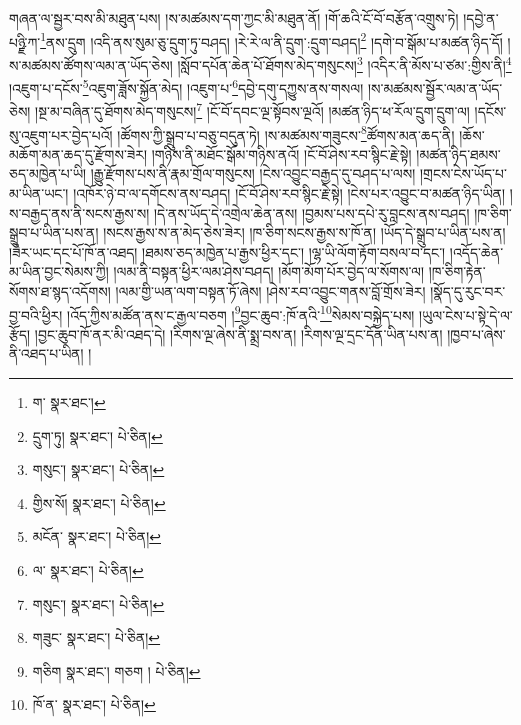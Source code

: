 གཞན་ལ་སྦྱར་བས་མི་མཐུན་པས། །ས་མཚམས་དག་ཀྱང་མི་མཐུན་ནོ། །གོ་ཆའི་ངོ་བོ་བརྩོན་འགྲུས་ཏེ། །དབྱེ་ན་པཉྫི་ཀ་\footnote{ག་  སྣར་ཐང་། }ནས་དྲུག །འདི་ནས་སུམ་ཅུ་དྲུག་ཏུ་བཤད། །རེ་རེ་ལ་ནི་དྲུག་:དྲུག་བཤད།\footnote{དྲུག་ཏུ།  སྣར་ཐང་།  པེ་ཅིན། } །དགེ་བ་སྒོམ་པ་མཚན་ཉིད་དོ། །ས་མཚམས་ཚོགས་ལམ་ན་ཡོད་ཅེས། །སློབ་དཔོན་ཆེན་པོ་ཐོགས་མེད་གསུངས།\footnote{གསུང་།  སྣར་ཐང་།  པེ་ཅིན། } །འདིར་ནི་མོས་པ་ཙམ་:གྱིས་ནི།\footnote{གྱིས་སོ།  སྣར་ཐང་།  པེ་ཅིན། } །འཇུག་པ་དངོས་\footnote{མངོན་  སྣར་ཐང་།  པེ་ཅིན། }འཇུག་ཟློས་སྐྱོན་མེད། །འཇུག་པ་\footnote{ལ་  སྣར་ཐང་།  པེ་ཅིན། }དབྱེ་དགུ་དཀྱུས་ནས་གསལ། །ས་མཚམས་སྦྱོར་ལམ་ན་ཡོད་ཅེས། །སྔ་མ་བཞིན་དུ་ཐོགས་མེད་གསུངས།\footnote{གསུང་།  སྣར་ཐང་།  པེ་ཅིན། } །ངོ་བོ་དབང་ལྔ་སྟོབས་ལྔའོ། །མཚན་ཉིད་ཕ་རོལ་དྲུག་དྲུག་ལ། །དངོས་སུ་འཇུག་པར་བྱེད་པའོ། །ཚོགས་ཀྱི་སྒྲུབ་པ་བཅུ་བདུན་ཏེ། །ས་མཚམས་གཟུངས་\footnote{གཟུང་  སྣར་ཐང་།  པེ་ཅིན། }ཚོགས་མན་ཆད་ནི། །ཆོས་མཆོག་མན་ཆད་དུ་རྫོགས་ཟེར། །གཉིས་ནི་མཐོང་སྒོམ་གཉིས་ནའོ། །ངོ་བོ་ཤེས་རབ་སྙིང་རྗེ་སྟེ། །མཚན་ཉིད་ཐམས་ཅད་མཁྱེན་པ་ཡི། །རྒྱུ་རྫོགས་པས་ནི་རྣམ་གྲོལ་གསུངས། །ངེས་འབྱུང་བརྒྱད་དུ་བཤད་པ་ལས། །གྲངས་ངེས་ཡོད་པ་མ་ཡིན་ཡང་། །འཁོར་ཉེ་བ་ལ་དགོངས་ནས་བཤད། །ངོ་བོ་ཤེས་རབ་སྙིང་རྗེ་སྟེ། །ངེས་པར་འབྱུང་བ་མཚན་ཉིད་ཡིན། །ས་བརྒྱད་ནས་ནི་སངས་རྒྱས་ས། །དེ་ནས་ཡོད་དེ་འགྲེལ་ཆེན་ནས། །བྱམས་པས་དཔེ་རུ་བླངས་ནས་བཤད། །ཁ་ཅིག་སྒྲུབ་པ་ཡིན་པས་ན། །སངས་རྒྱས་ས་ན་མེད་ཅེས་ཟེར། །ཁ་ཅིག་སངས་རྒྱས་ས་ཁོ་ན། །ཡོད་དེ་སྒྲུབ་པ་ཡིན་པས་ན། །ཟེར་ཡང་དང་པོ་ཁོ་ན་འཐད། །ཐམས་ཅད་མཁྱེན་པ་རྒྱས་ཕྱིར་དང་། །ལྷ་ཡི་ལོག་རྟོག་བསལ་བ་དང་། །འདོད་ཆེན་མ་ཡིན་བྱང་སེམས་ཀྱི། །ལམ་ནི་བསྟན་ཕྱིར་ལམ་ཤེས་བཤད། །མོག་མོག་པོར་བྱེད་ལ་སོགས་ལ། །ཁ་ཅིག་རྟེན་སོགས་ཐ་སྙད་འདོགས། །ལམ་གྱི་ཡན་ལག་བསྟན་ཏོ་ཞེས། །ཤེས་རབ་འབྱུང་གནས་བློ་གྲོས་ཟེར། །སྣོད་དུ་རུང་བར་བྱ་བའི་ཕྱིར། །འོད་ཀྱིས་མཚོན་ནས་ང་རྒྱལ་བཅག །\footnote{གཅིག   སྣར་ཐང་། གཅག །  པེ་ཅིན། }བྱང་ཆུབ་:ཁོ་ནའི་\footnote{ཁོ་ན་  སྣར་ཐང་།  པེ་ཅིན། }སེམས་བསྐྱེད་པས། །ཡུལ་ངེས་པ་སྟེ་དེ་ལ་རྩོད། །བྱང་ཆུབ་ཁོ་ནར་མི་འཐད་དེ། །རིགས་ལྔ་ཞེས་ནི་སྨྲ་བས་ན། །རིགས་ལྔ་དྲང་དོན་ཡིན་པས་ན། །ཁྱབ་པ་ཞེས་ནི་འཐད་པ་ཡིན། །
